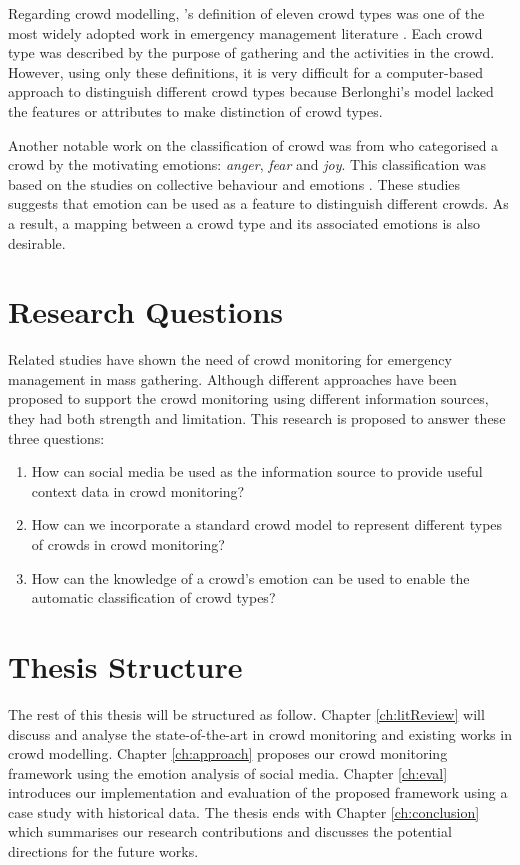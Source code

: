 Regarding crowd modelling, \textcite{Berlonghi1995}'s definition of eleven crowd types was one of the most widely adopted work in emergency management literature \parencite{FEMA2005, EMA1999}. Each crowd type was described by the purpose of gathering and the activities in the crowd. However, using only these definitions, it is very difficult for a computer-based approach to distinguish different crowd types because Berlonghi's model lacked the features or attributes to make distinction of crowd types. 

Another notable work on the classification of crowd was from \textcite{Lofland1985} who categorised a crowd by the motivating emotions: \textit{anger}, \textit{fear} and \textit{joy}. This classification was based on the studies on collective behaviour and emotions \parencite{Lofland1985,Smelser1998,Brown1954}. These studies suggests that emotion can be used as a feature to distinguish different crowds. As a result, a mapping between a crowd type and its associated emotions is also desirable. 

\section{Research Questions}
Related studies have shown the need of crowd monitoring for emergency management in mass gathering. Although different approaches have been proposed to support the crowd monitoring using different information sources, they had both strength and limitation. This research is proposed to answer these three questions:
\begin{enumerate}
\item How can social media be used as the information source to provide useful context data in crowd monitoring?
\item How can we incorporate a standard crowd model to represent different types of crowds in crowd monitoring?
\item How can the knowledge of a crowd's emotion can be used to enable the automatic classification of crowd types?
\end{enumerate}

\section{Thesis Structure}
The rest of this thesis will be structured as follow. Chapter \ref{ch:litReview} will discuss and analyse the state-of-the-art in crowd monitoring and existing works in crowd modelling. Chapter \ref{ch:approach} proposes our crowd monitoring framework using the emotion analysis of social media. Chapter \ref{ch:eval} introduces our implementation and evaluation of the proposed framework using a case study with historical data. The thesis ends with Chapter \ref{ch:conclusion} which summarises our research contributions and discusses the potential directions for the future works.

